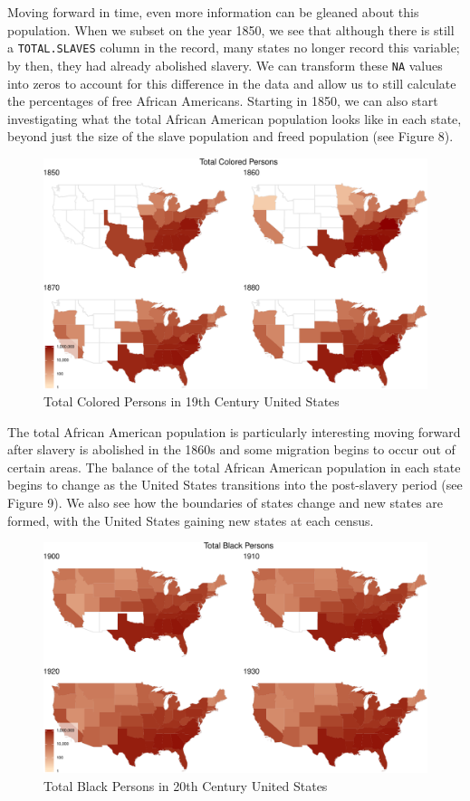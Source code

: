 \documentclass[11pt,]{article}
\begin{document}
Moving forward in time, even more information can be gleaned about this
population. When we subset on the year 1850, we see that although there
is still a \texttt{TOTAL.SLAVES} column in the record, many states no
longer record this variable; by then, they had already abolished
slavery. We can transform these \texttt{NA} values into zeros to account
for this difference in the data and allow us to still calculate the
percentages of free African Americans. Starting in 1850, we can also
start investigating what the total African American population looks
like in each state, beyond just the size of the slave population and
freed population (see Figure 8).

\begin{figure}[htbp]
\centering
\includegraphics{writeup_files/figure-latex/unnamed-chunk-7-1.pdf}
\caption{Total Colored Persons in 19th Century United States}
\end{figure}

The total African American population is particularly interesting moving
forward after slavery is abolished in the 1860s and some migration
begins to occur out of certain areas. The balance of the total African
American population in each state begins to change as the United States
transitions into the post-slavery period (see Figure 9). We also see how
the boundaries of states change and new states are formed, with the
United States gaining new states at each census.

\begin{figure}[htbp]
\centering
\includegraphics{writeup_files/figure-latex/unnamed-chunk-8-1.pdf}
\caption{Total Black Persons in 20th Century United States}
\end{figure}
\end{document}
